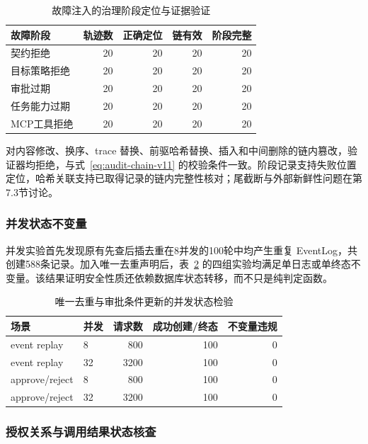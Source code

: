 \begin{table}[htbp]
\centering
\caption{故障注入的治理阶段定位与证据验证}
\label{tab:rq3-trace-v11}
\small
\begin{tabular}{lrrrr}
\toprule
故障阶段 & 轨迹数 & 正确定位 & 链有效 & 阶段完整 \\
\midrule
契约拒绝 & 20 & 20 & 20 & 20 \\
目标策略拒绝 & 20 & 20 & 20 & 20 \\
审批过期 & 20 & 20 & 20 & 20 \\
任务能力过期 & 20 & 20 & 20 & 20 \\
MCP工具拒绝 & 20 & 20 & 20 & 20 \\
\bottomrule
\end{tabular}
\end{table}

对内容修改、换序、trace 替换、前驱哈希替换、插入和中间删除的链内篡改，验证器均拒绝，与式~\eqref{eq:audit-chain-v11} 的校验条件一致。阶段记录支持失败位置定位，哈希关联支持已取得记录的链内完整性核对；尾截断与外部新鲜性问题在第7.3节讨论。

\subsubsection{并发状态不变量}

并发实验首先发现原有先查后插去重在8并发的100轮中均产生重复 EventLog，共创建588条记录。加入唯一去重声明后，表~\ref{tab:concurrency-v11} 的四组实验均满足单日志或单终态不变量。该结果证明安全性质还依赖数据库状态转移，而不只是纯判定函数。

\begin{table}[htbp]
\centering
\caption{唯一去重与审批条件更新的并发状态检验}
\label{tab:concurrency-v11}
\small
\begin{tabular}{llrrr}
\toprule
场景 & 并发 & 请求数 & 成功创建/终态 & 不变量违规 \\
\midrule
event replay & 8 & 800 & 100 & 0 \\
event replay & 32 & 3200 & 100 & 0 \\
approve/reject & 8 & 800 & 100 & 0 \\
approve/reject & 32 & 3200 & 100 & 0 \\
\bottomrule
\end{tabular}
\end{table}

\subsubsection{授权关系与调用结果状态核查}
\label{sec:evidence-rr022}

